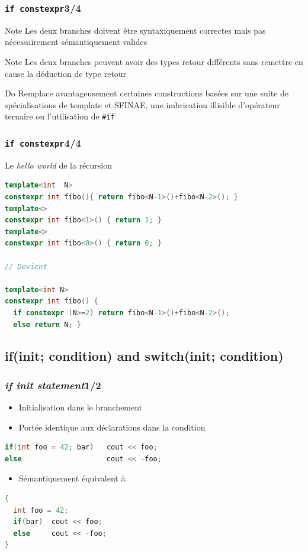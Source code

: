 \documentclass[C++.tex]{subfiles}
\begin{document}
\begin{frame}[fragile]
	\frametitle{\lstinline|if constexpr|\titlehfill{}3/4}
	\begin{block}{Note}
		Les deux branches doivent être syntaxiquement correctes mais pas nécessairement sémantiquement valides
	\end{block}

	\begin{block}{Note}
		Les deux branches peuvent avoir des types retour différents sans remettre en cause la déduction de type retour
	\end{block}

	\begin{exampleblock}{Do}
		Remplace avantageusement certaines constructions basées sur une suite de spécialisations de template et SFINAE, une imbrication illisible d'opérateur ternaire ou l'utilisation de \lstinline|#if|
	\end{exampleblock}
\end{frame}

\begin{frame}[fragile]
	\frametitle{\lstinline|if constexpr|\titlehfill{}4/4}
	\begin{block}{Le \textit{hello world} de la récursion}
		\begin{lstlisting}[language=C++]
template<int  N>
constexpr int fibo(){ return fibo<N-1>()+fibo<N-2>(); }
template<>
constexpr int fibo<1>() { return 1; }
template<>
constexpr int fibo<0>() { return 0; }

// Devient

template<int N>
constexpr int fibo() {
  if constexpr (N>=2) return fibo<N-1>()+fibo<N-2>();
  else return N; }\end{lstlisting}
	\end{block}
\end{frame}

\subsection*{if(init; condition) and switch(init; condition)}
\begin{frame}[fragile]
	\frametitle{\textit{if init statement}\titlehfill{}1/2}
	\begin{itemize}
		\item Initialisation dans le branchement
		\item Portée identique aux déclarations dans la condition
	\end{itemize}

	\begin{lstlisting}[language=C++]
if(int foo = 42; bar)   cout << foo;
else                    cout << -foo;\end{lstlisting}

	\begin{itemize}
		\item Sémantiquement équivalent à
	\end{itemize}

	\begin{lstlisting}[language=C++]
{
  int foo = 42;
  if(bar)  cout << foo;
  else     cout << -foo;
}\end{lstlisting}
\end{frame}
\end{document}
